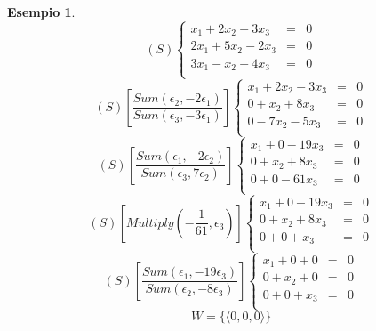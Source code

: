\documentclass[12pt,a4paper]{article}
\theoremstyle{break}
\newtheorem{example}{Esempio}[subsection]
\begin{document}
    \begin{example}
        \[(S) 
        \left\{ 
            \begin{array}{lcr} 
                x_1 + 2x_2 - 3x_3 & = & 0 \\
                2x_1 + 5x_2 -2x_3 & = & 0 \\
                3x_1 - x_2 - 4x_3 & = & 0 \\
            \end{array}
            \right. 
        \]
        \[(S) \left[\frac{Sum(\epsilon_2,-2\epsilon_1)}{Sum(\epsilon_3,-3\epsilon_1)}\right]
        \left\{ 
            \begin{array}{lcr} 
                x_1 + 2x_2 - 3x_3 & = & 0 \\
                0 + x_2 + 8x_3 & = & 0 \\
                0 - 7x_2 - 5x_3 & = & 0 \\
            \end{array}
            \right. 
        \]
        \[(S) \left[\frac{Sum(\epsilon_1,-2\epsilon_2)}{Sum(\epsilon_3,7\epsilon_2)}\right]
        \left\{ 
            \begin{array}{lcr} 
                x_1 + 0 - 19x_3 & = & 0 \\
                0 + x_2 + 8x_3 & = & 0 \\
                0 + 0 - 61x_3 & = & 0 \\
            \end{array}
            \right. 
        \]
        \[(S) \left[Multiply(-\frac{1}{61},\epsilon_3)\right]
        \left\{ 
            \begin{array}{lcr} 
                x_1 + 0 - 19x_3 & = & 0 \\
                0 + x_2 + 8x_3 & = & 0 \\
                0 + 0 + x_3 & = & 0 \\
            \end{array}
            \right. 
        \]
        \[(S) \left[\frac{Sum(\epsilon_1,-19\epsilon_3)}{Sum(\epsilon_2,-8\epsilon_3)}\right]
        \left\{ 
            \begin{array}{lcr} 
                x_1 + 0 + 0 & = & 0 \\
                0 + x_2 + 0 & = & 0 \\
                0 + 0 + x_3 & = & 0 \\
            \end{array}
            \right. 
        \]
        \[W = \{\langle 0,0,0 \rangle\}\]
    \end{example}
\end{document}
